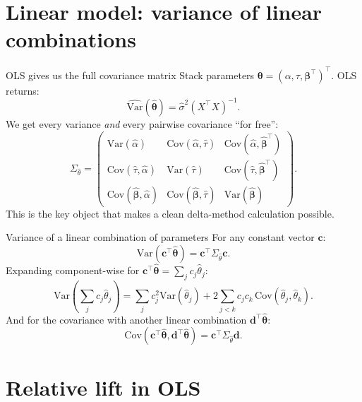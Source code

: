\documentclass[10pt]{beamer}
\begin{document}
\section{Linear model: variance of linear combinations}

\begin{frame}{OLS gives us the full covariance matrix}
Stack parameters $\bm{\theta} = (\alpha, \tau, \bm{\beta}^\top)^\top$. OLS returns:
\[
\widehat{\mathrm{Var}}(\hat{\bm{\theta}}) = \hat\sigma^2 (X^\top X)^{-1}.
\]
We get \alert{every} variance \emph{and} every pairwise covariance ``for free'':
\[
\Sigma_{\hat\theta} =
\begin{pmatrix}
\mathrm{Var}(\hat\alpha)        & \mathrm{Cov}(\hat\alpha,\hat\tau)   & \mathrm{Cov}(\hat\alpha,\hat{\bm\beta}^\top) \\
\mathrm{Cov}(\hat\tau,\hat\alpha) & \mathrm{Var}(\hat\tau)            & \mathrm{Cov}(\hat\tau,\hat{\bm\beta}^\top)   \\
\mathrm{Cov}(\hat{\bm\beta},\hat\alpha) & \mathrm{Cov}(\hat{\bm\beta},\hat\tau) & \mathrm{Var}(\hat{\bm\beta})
\end{pmatrix}.
\]
This is the key object that makes a clean delta-method calculation possible.
\end{frame}

\begin{frame}{Variance of a linear combination of parameters}
For any constant vector $\mathbf{c}$:
\[
\mathrm{Var}(\mathbf{c}^\top \hat{\bm\theta}) = \mathbf{c}^\top \Sigma_{\hat\theta} \mathbf{c}.
\]
Expanding component-wise for $\mathbf{c}^\top \hat{\bm\theta} = \sum_j c_j \hat\theta_j$:
\[
\mathrm{Var}\!\left(\sum_j c_j \hat\theta_j\right)
= \sum_j c_j^2 \mathrm{Var}(\hat\theta_j) + 2\sum_{j<k} c_j c_k\,\mathrm{Cov}(\hat\theta_j, \hat\theta_k).
\]
And for the covariance with another linear combination $\mathbf{d}^\top \hat{\bm\theta}$:
\[
\mathrm{Cov}(\mathbf{c}^\top\hat{\bm\theta}, \mathbf{d}^\top\hat{\bm\theta}) = \mathbf{c}^\top \Sigma_{\hat\theta} \mathbf{d}.
\]
\end{frame}

\section{Relative lift in OLS}
\end{document}
